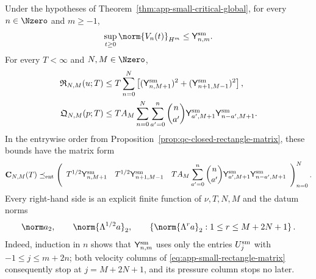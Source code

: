 \begin{proposition}
\label{prop:app-small-data-rectangles}
Under the hypotheses of Theorem~\ref{thm:app-small-critical-global}, for
every \(n\in\Nzero\) and \(m\ge-1\),
\begin{equation}
 \sup_{t\ge0}\norm{V_n(t)}_{H^m}
 \le\mathsf Y_{n,m}^{\rm sm}.
 \label{eq:app-small-time-row}
\end{equation}
For every \(T<\infty\) and \(N,M\in\Nzero\),
\begin{align}
 \mathfrak R_{N,M}(u;T)
 &\le
 T\sum_{n=0}^{N}
 \left[
 (\mathsf Y_{n,M+1}^{\rm sm})^2
 +(\mathsf Y_{n+1,M-1}^{\rm sm})^2
 \right],
 \label{eq:app-small-rectangle}\\
 \mathfrak Q_{N,M}(p;T)
 &\le
 TA_M\sum_{n=0}^{N}\sum_{a'=0}^{n}\binom n{a'}
 \mathsf Y_{a',M+1}^{\rm sm}
 \mathsf Y_{n-a',M+1}^{\rm sm}.
 \label{eq:app-small-pressure-rectangle}
\end{align}
In the entrywise order from
Proposition~\ref{prop:qc-closed-rectangle-matrix}, these bounds have the
matrix form
\begin{equation}
 \mathbf C_{N,M}(T)
 \preceq_{\rm ent}
 \left(
 \begin{array}{ccc}
  T^{1/2}\mathsf Y_{n,M+1}^{\rm sm}
  &T^{1/2}\mathsf Y_{n+1,M-1}^{\rm sm}
  &TA_M\displaystyle\sum_{a'=0}^{n}\binom n{a'}
    \mathsf Y_{a',M+1}^{\rm sm}
    \mathsf Y_{n-a',M+1}^{\rm sm}
 \end{array}
 \right)_{n=0}^{N}.
 \label{eq:app-small-rectangle-matrix}
\end{equation}
Every right-hand side is an explicit finite function of \(\nu,T,N,M\) and
the datum norms
\begin{equation}
 \norm a_2,\qquad
 \norm{\Lambda^{1/2}a}_2,\qquad
 \left\{\norm{\Lambda^ra}_2:
  1\le r\le M+2N+1\right\}.
 \label{eq:app-small-data-derivative-ceiling}
\end{equation}
Indeed, induction in \(n\) shows that
\(\mathsf Y_{n,m}^{\rm sm}\) uses only the entries
\(U_j^{\rm sm}\) with \(-1\le j\le m+2n\); both velocity columns of
\eqref{eq:app-small-rectangle-matrix} consequently stop at
\(j=M+2N+1\), and its pressure column stops no later.
\end{proposition}

